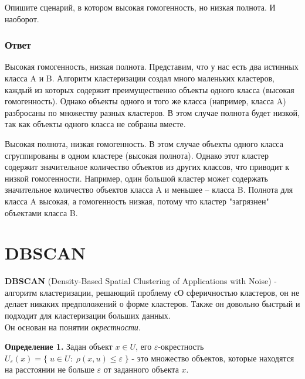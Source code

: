 Опишите сценарий, в котором высокая гомогенность, но низкая полнота. И наоборот.

\subsubsection{Ответ}

Высокая гомогенность, низкая полнота. Представим, что у нас есть два истинных класса A и B. Алгоритм кластеризации создал много маленьких кластеров, каждый из которых содержит преимущественно объекты одного класса (высокая гомогенность). Однако объекты одного и того же класса (например, класса A) разбросаны по множеству разных кластеров. В этом случае полнота будет низкой, так как объекты одного класса не собраны вместе.

Высокая полнота, низкая гомогенность. В этом случае объекты одного класса сгруппированы в одном кластере (высокая полнота). Однако этот кластер содержит значительное количество объектов из других классов, что приводит к низкой гомогенности. Например, один большой кластер может содержать значительное количество объектов класса A и меньшее -- класса B. Полнота для класса A высокая, а гомогенность низкая, потому что кластер "загрязнен" объектами класса B.

\section{DBSCAN}

\textbf{DBSCAN} (Density-Based Spatial Clustering of Applications with Noise) - алгоритм кластеризации, решающий проблему сО сферичностью кластеров, он не делает никаких предположений о форме кластеров. Также он довольно быстрый и подходит для кластеризации больших данных.
\\
Он основан на понятии {\textit{окрестности}}.

\textbf{Определение 1.} Задан объект $x \in U$, его $\varepsilon$-окрестность $U_\varepsilon (x) = \{\;u\in U:\; \rho (x,u) \leq \varepsilon \;\}$ - это множество объектов, которые находятся на расстоянии не больше $\varepsilon$ от заданного объекта $x$.


